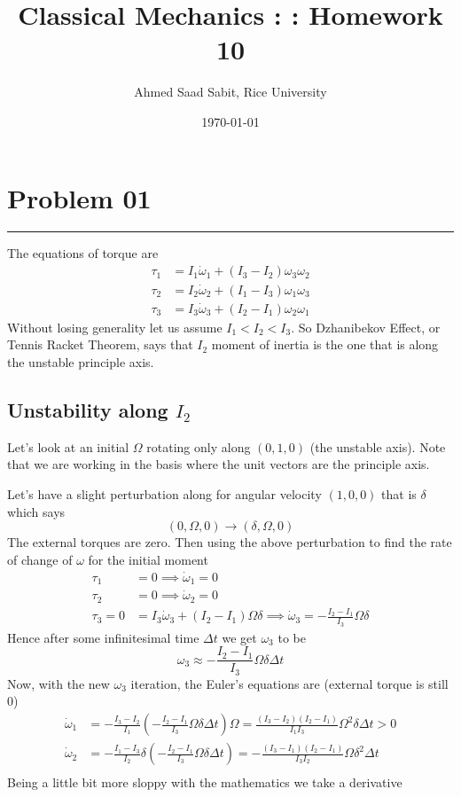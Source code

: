 \documentclass[letter, 10pts]{article}
\title{Classical Mechanics : : Homework 10}
\author{Ahmed Saad Sabit, Rice University}
\date{\today}
\begin{document}
\maketitle

\section*{Problem 01} 
\hrule
The equations of torque are 
\begin{align*}
	\tau_1 &= I_1 \dot{\omega}_1 + (I_3 - I_2) \omega_3 \omega_2 \\ 
	\tau_2 &= I_2 \dot \omega_2 + (I_1 - I_3) \omega_1 \omega_3 \\ 
	\tau_3 &= I_3 \dot \omega_3 + (I_2 - I_1) \omega_2 \omega_1 
\end{align*}
Without losing generality let us assume $I_1 < I_2 < I_3$. So Dzhanibekov Effect, or Tennis Racket Theorem, says that $I_2$ moment of inertia is the one that is along the unstable principle axis.

\subsection*{Unstability along $I_2$ }
Let's look at an initial $\Omega$ rotating only along $(0,1,0)$ (the unstable axis). Note that we are working in the basis where the unit vectors are the principle axis. 

Let's have a slight perturbation along for angular velocity $(1,0,0)$ that is $\delta$ which says 
\[
	(0, \Omega, 0) \to (\delta, \Omega, 0)
\] 
The external torques are zero. Then using the above perturbation to find the rate of change of $\omega$ for the initial moment
\begin{align*}
	\tau_1 &=  0 \implies \dot{\omega}_1 = 0 \\ 
	\tau_2 &=  0 \implies \dot \omega_2 = 0 \\ 
	\tau_3 =0 &= I_3 \dot \omega_3 + (I_2 - I_1) \Omega \delta  \implies \dot \omega_3 = - \frac{I_2 - I_1}{I_3} \Omega \delta
\end{align*}
Hence after some infinitesimal time $\Delta t$ we get $\omega_3$ to be 
\[
	\omega_3 \approx - \frac{I_2 - I_1}{I_3} \Omega \delta \Delta t
\] 
Now, with the new $\omega_3$ iteration, the Euler's equations are (external torque is still 0)
\begin{align*}
\dot{\omega}_1 &= - \frac{I_3 - I_2}{I_1} \left(- \frac{I_2 - I_1}{I_3} \Omega \delta \Delta t\right) \Omega 
=
\frac{(I_3 - I_2)(I_2 - I_1)}{I_1 I_3} \Omega^2 \delta \Delta t > 0
\\
\dot \omega_2 &= - \frac{I_1 - I_3}{I_2} \delta \left(- \frac{I_2 - I_1}{I_3} \Omega \delta \Delta t\right) = - 
\frac{(I_3 - I_1)(I_2 - I_1)}{I_3 I_2} \Omega \delta^2 \Delta t\\
\end{align*}
Being a little bit more sloppy with the mathematics we take a derivative
\end{document}
